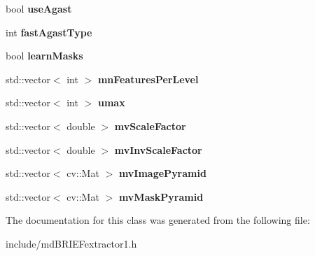 \begin{DoxyCompactItemize}
\item 
bool {\bfseries use\+Agast}\hypertarget{classmdBRIEFextractor1_a302438233985316d3339955def3e120c}{}\label{classmdBRIEFextractor1_a302438233985316d3339955def3e120c}

\item 
int {\bfseries fast\+Agast\+Type}\hypertarget{classmdBRIEFextractor1_af8746fcd77fd7f41f10f5390f68d87d7}{}\label{classmdBRIEFextractor1_af8746fcd77fd7f41f10f5390f68d87d7}

\item 
bool {\bfseries learn\+Masks}\hypertarget{classmdBRIEFextractor1_a7acde3d9af442364327ff8a9b64c8374}{}\label{classmdBRIEFextractor1_a7acde3d9af442364327ff8a9b64c8374}

\item 
std\+::vector$<$ int $>$ {\bfseries mn\+Features\+Per\+Level}\hypertarget{classmdBRIEFextractor1_a12ab5edd862ba20eca826f402184acce}{}\label{classmdBRIEFextractor1_a12ab5edd862ba20eca826f402184acce}

\item 
std\+::vector$<$ int $>$ {\bfseries umax}\hypertarget{classmdBRIEFextractor1_ae796c51d02cc2dbcf37c142b6876ba53}{}\label{classmdBRIEFextractor1_ae796c51d02cc2dbcf37c142b6876ba53}

\item 
std\+::vector$<$ double $>$ {\bfseries mv\+Scale\+Factor}\hypertarget{classmdBRIEFextractor1_a6ecaa899738234ab1958bbd2506ee254}{}\label{classmdBRIEFextractor1_a6ecaa899738234ab1958bbd2506ee254}

\item 
std\+::vector$<$ double $>$ {\bfseries mv\+Inv\+Scale\+Factor}\hypertarget{classmdBRIEFextractor1_a82bcbbd1bd8c182a7f74460efe1afec4}{}\label{classmdBRIEFextractor1_a82bcbbd1bd8c182a7f74460efe1afec4}

\item 
std\+::vector$<$ cv\+::\+Mat $>$ {\bfseries mv\+Image\+Pyramid}\hypertarget{classmdBRIEFextractor1_a8b540b42ad288eb16788210a095907af}{}\label{classmdBRIEFextractor1_a8b540b42ad288eb16788210a095907af}

\item 
std\+::vector$<$ cv\+::\+Mat $>$ {\bfseries mv\+Mask\+Pyramid}\hypertarget{classmdBRIEFextractor1_ac44c6de3cee6625beb5125a85db829f4}{}\label{classmdBRIEFextractor1_ac44c6de3cee6625beb5125a85db829f4}

\end{DoxyCompactItemize}


The documentation for this class was generated from the following file\+:\begin{DoxyCompactItemize}
\item 
include/md\+B\+R\+I\+E\+Fextractor1.\+h\end{DoxyCompactItemize}
